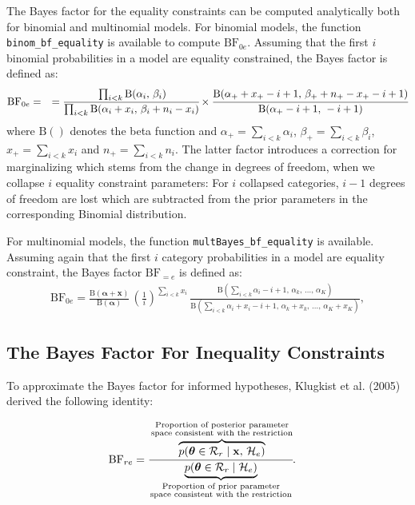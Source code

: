 \documentclass[
  english,
  man,floatsintext]{apa6}
\begin{document}
The Bayes factor for the equality constraints can be computed analytically both for binomial and multinomial models. For binomial models, the function \texttt{binom\_bf\_equality} is available to compute \(\text{BF}_{0e}\). Assuming that the first \(i\) binomial probabilities in a model are equality constrained, the Bayes factor is defined as:
\begin{align*}
\text{BF}_{0e} &=
&= \cfrac{\prod_{i < k} \text{B}(\alpha_i\text{, } \beta_i)}{\prod_{i < k} \text{B}(\alpha_i + x_i\text{, } \beta_i + n_i - x_i)} \times \cfrac{\text{B}(\alpha_+ + x_+ - i + 1\text{, } \beta_+ + n_+ - x_+ - i + 1)}{\text{B}(\alpha_+ - i + 1\text{, } - i + 1)}
\end{align*}
where \(\text{B}()\) denotes the beta function and \(\alpha_+ = \sum_{i<k}\alpha_i\), \(\beta_+ = \sum_{i<k}\beta_i\), \(x_+ = \sum_{i<k} x_i\) and \(n_+ = \sum_{i<k} n_i\). The latter factor introduces a correction for marginalizing which stems from the change in degrees of freedom, when we collapse \(i\) equality constraint parameters: For \(i\) collapsed categories, \(i - 1\) degrees of freedom are lost which are subtracted from the prior parameters in the corresponding Binomial distribution.

For multinomial models, the function \texttt{multBayes\_bf\_equality} is available. Assuming again that the first \(i\) category probabilities in a model are equality constraint, the Bayes factor \(\text{BF}_{=e}\) is defined as:
\begin{align*}
\text{BF}_{0e} = \frac{\text{B}(\boldsymbol{\alpha}+\mathbf{x})}{\text{B}(\boldsymbol{\alpha})} \, \left(\frac{1}{i}\right)^{\sum_{i<k} x_i}\,\frac{
 \text{B}\left(\sum_{i<k}\alpha_i - i + 1\text{, }\alpha_{k}\text{, }\dots\text{, }\alpha_K\right)}{\text{B}\left(\sum_{i<k}\alpha_i+x_i - i + 1\text{, }\alpha_{k}+x_{k}\text{, }\dots\text{, }\alpha_K+x_K\right)},
\end{align*}

\hypertarget{the-bayes-factor-for-inequality-constraints}{%
\subsection{The Bayes Factor For Inequality Constraints}\label{the-bayes-factor-for-inequality-constraints}}

To approximate the Bayes factor for informed hypotheses, Klugkist et al. (2005) derived the following identity:

\begin{align}
\label{Eq:klugkistIdentity}
\text{BF}_{re} &= \cfrac{\overbrace{p(\boldsymbol{\theta} \in \mathcal{R}_r \mid \mathbf{x}\text{, }\mathcal{H}_e)}^{\substack{\text{Proportion of posterior parameter}\\\text{space consistent with the restriction}}}}{\underbrace{p(\boldsymbol{\theta} \in \mathcal{R}_r \mid  \mathcal{H}_e)}_{\substack{\text{Proportion of prior parameter}\\\text{space consistent with the restriction}}}}.
\end{align}
\end{document}

